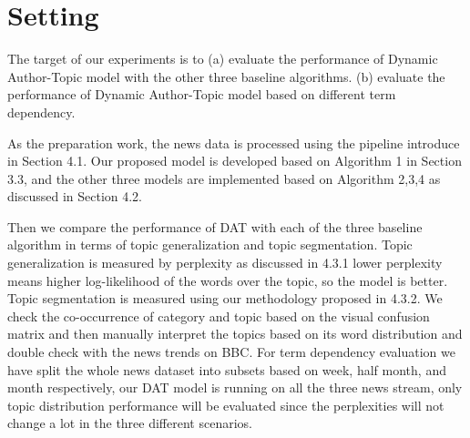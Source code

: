 {\section{Setting}

The target of our experiments is to (a) evaluate the performance of Dynamic Author-Topic model with the other three baseline algorithms. (b) evaluate the performance of Dynamic Author-Topic model based on different term dependency. 

As the preparation work, the news data is processed using the pipeline introduce in Section 4.1. Our proposed model is developed based on Algorithm 1 in Section 3.3, and the other three models are implemented based on Algorithm 2,3,4 as discussed in Section 4.2. 

Then we compare the performance of DAT with each of the three baseline algorithm in terms of topic generalization and topic segmentation. Topic generalization is measured by perplexity as discussed in 4.3.1 lower perplexity means higher log-likelihood of the words over the topic, so the model is better. Topic segmentation is measured using our methodology proposed in 4.3.2. We check the co-occurrence of category and topic based on the visual confusion matrix and then manually interpret the topics based on its word distribution and double check with the news trends on BBC. 
For term dependency evaluation we have split the whole news dataset into subsets based on week, half month, and month respectively, our DAT model is running on all the three news stream, only topic distribution performance will be evaluated since the perplexities will not change a lot in the three different scenarios.

}
